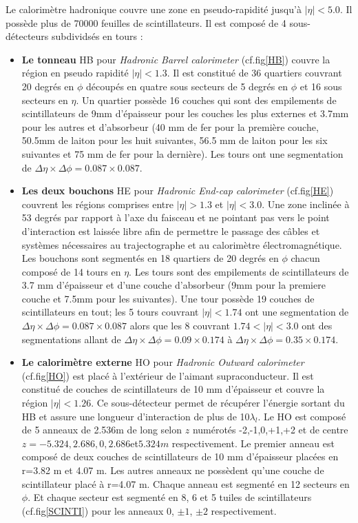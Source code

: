 Le calorimètre hadronique couvre une zone en pseudo-rapidité jusqu'à $|\eta|<5.0$. Il possède plus de 70000 feuilles de scintillateurs. Il est composé de 4 sous-détecteurs subdividsés en tours : 
\begin{itemize}[label=$\bullet$]
	\item \textbf{Le tonneau} HB pour \textit{Hadronic Barrel calorimeter} (cf.fig\ref{HB}) couvre la région en pseudo rapidité $|\eta|<1.3$. Il est constitué de 36 quartiers couvrant 20 degrés en $\phi$ découpés en quatre sous secteurs de 5 degrés en $\phi$ et 16 sous secteurs en $\eta$. Un quartier possède 16 couches qui sont des empilements de scintillateurs de 9mm d'épaisseur pour les couches les plus externes et 3.7mm pour les autres et d'absorbeur (40 mm de fer pour la première couche, 50.5mm de laiton pour les huit suivantes, 56.5 mm de laiton pour les six suivantes et 75 mm de fer pour la dernière). Les tours ont une segmentation de $\Delta\eta\times\Delta\phi=0.087\times0.087$.
	\item \textbf{Les deux bouchons} HE pour \textit{Hadronic End-cap calorimeter} (cf.fig\ref{HE}) couvrent les régions comprises entre $|\eta|>1.3$ et $|\eta|<3.0$. Une zone inclinée à 53 degrés par rapport à l'axe du faisceau et ne pointant pas vers le point d'interaction est laissée libre afin de permettre le passage des câbles et systèmes nécessaires au trajectographe et au calorimètre électromagnétique. Les bouchons sont segmentés en 18 quartiers de 20 degrés en $\phi$ chacun composé de 14 tours en $\eta$. Les tours sont des empilements de scintillateurs de 3.7 mm d'épaisseur et d'une couche d'absorbeur (9mm pour la premiere couche et 7.5mm pour les suivantes). Une tour possède 19 couches de  scintillateurs en tout; les 5 tours couvrant $|\eta|<1.74$ ont une segmentation de $\Delta\eta\times\Delta\phi=0.087\times0.087$ alors que les 8 couvrant $1.74<|\eta|<3.0$ ont des segmentations allant de $\Delta\eta\times\Delta\phi=0.09\times0.174$ à $\Delta\eta\times\Delta\phi=0.35\times0.174$.
	\item \textbf{Le calorimètre externe} HO pour \textit{Hadronic Outward calorimeter} (cf.fig\ref{HO}) est placé à l'extérieur de l'aimant supraconducteur. Il est constitué de couches de scintillateurs de 10 mm d'épaisseur et couvre la région $|\eta|<1.26$. Ce sous-détecteur permet de récupérer l'énergie sortant du HB et assure une longueur d'interaction de plus de 10$\lambda_{l}$. Le HO est composé de 5 anneaux de 2.536m de long selon $z$ 
	numérotés -2,-1,0,+1,+2 et de centre $z=-5.324, 2.686, 0, 2.686 $et$ 5.324m$ respectivement. Le premier anneau est composé de deux couches de scintillateurs de 10 mm d'épaisseur placées en r=3.82 m et 4.07 m. Les autres anneaux ne possèdent qu'une couche de scintillateur placé à r=4.07 m. Chaque anneau est segmenté en 12 secteurs en $\phi$. Et chaque secteur est segmenté en 8, 6 et 5 tuiles de scintillateurs (cf.fig\ref{SCINTI}) pour les anneaux 0, $\pm1$, $\pm2$ respectivement.

\end{itemize}

